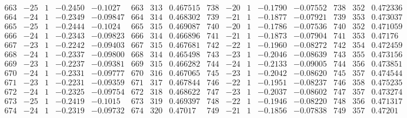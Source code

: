 \documentclass[11pt,reqno,a4letter]{article}
\numberwithin{figure}{section}
\numberwithin{table}{section}
\theoremstyle{plain}
\numberwithin{theorem}{section}
\theoremstyle{definition}
\begin{document}
\begin{table}[ht]
\begin{equation*}
{\begin{array}{ccccc|ccc|ccccc|ccc}
 663 & -25 & 1 & -0.2450 & -0.1027 & 663 & 313 & 0.467515 & 738 & -20 & 1 & -0.1790 & -0.07552 & 738 & 352 & 0.472336 \\
 664 & -24 & 1 & -0.2349 & -0.09847 & 664 & 314 & 0.468302 & 739 & -21 & 1 & -0.1877 & -0.07921 & 739 & 353 & 0.473037 \\
 665 & -25 & 1 & -0.2444 & -0.1024 & 665 & 315 & 0.469087 & 740 & -20 & 1 & -0.1786 & -0.07536 & 740 & 352 & 0.471059 \\
 666 & -24 & 1 & -0.2343 & -0.09823 & 666 & 314 & 0.466896 & 741 & -21 & 1 & -0.1873 & -0.07904 & 741 & 353 & 0.47176 \\
 667 & -23 & 1 & -0.2242 & -0.09403 & 667 & 315 & 0.467681 & 742 & -22 & 1 & -0.1960 & -0.08272 & 742 & 354 & 0.472459 \\
 668 & -24 & 1 & -0.2337 & -0.09800 & 668 & 314 & 0.465498 & 743 & -23 & 1 & -0.2046 & -0.08639 & 743 & 355 & 0.473156 \\
 669 & -23 & 1 & -0.2237 & -0.09381 & 669 & 315 & 0.466282 & 744 & -24 & 1 & -0.2133 & -0.09005 & 744 & 356 & 0.473851 \\
 670 & -24 & 1 & -0.2331 & -0.09777 & 670 & 316 & 0.467065 & 745 & -23 & 1 & -0.2042 & -0.08620 & 745 & 357 & 0.474544 \\
 671 & -23 & 1 & -0.2231 & -0.09359 & 671 & 317 & 0.467844 & 746 & -22 & 1 & -0.1951 & -0.08237 & 746 & 358 & 0.475235 \\
 672 & -24 & 1 & -0.2325 & -0.09754 & 672 & 318 & 0.468622 & 747 & -23 & 1 & -0.2037 & -0.08602 & 747 & 357 & 0.473274 \\
 673 & -25 & 1 & -0.2419 & -0.1015 & 673 & 319 & 0.469397 & 748 & -22 & 1 & -0.1946 & -0.08220 & 748 & 356 & 0.471317 \\
 674 & -24 & 1 & -0.2319 & -0.09732 & 674 & 320 & 0.47017 & 749 & -21 & 1 & -0.1856 & -0.07838 & 749 & 357 & 0.47201 \\
\end{array} 
}
\end{equation*} 
\clearpage 

\end{table} 

\clearpage 
\end{document}

